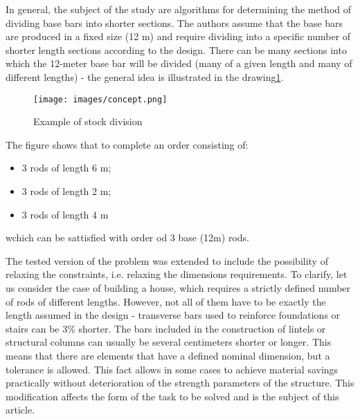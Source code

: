 In general, the subject of the study are algorithms for determining the method of dividing base bars into shorter sections. The authors assume that the base bars are produced in a fixed size (12 m) and require dividing into a specific number of shorter length sections according to the design. There can be many sections into which the 12-meter base bar will be divided (many of a given length and many of different lengths) - the general idea is illustrated in the drawing\ref{fig:concept}.

\begin{figure}[h]
    \centering
    \texttt{[image: images/concept.png]}
    \caption{Example of stock division}
    \label{fig:concept}
\end{figure}

The figure shows that to complete an order consisting of:
\begin{itemize}
\item 3 rods of length 6 m;
\item 3 rods of length 2 m;
\item 3 rods of length 4 m
\end{itemize}
wchich can be sattisfied with order od 3 base (12m) rods.

The tested version of the problem was extended to include the possibility of relaxing the constraints, i.e. relaxing the dimensions requirements. To clarify, let us consider the case of building a house, which requires a strictly defined number of rods of different lengths. However, not all of them have to be exactly the length assumed in the design - transverse bars used to reinforce foundations or stairs can be 3\% shorter. The bars included in the construction of lintels or structural columns can usually be several centimeters shorter or longer. This means that there are elements that have a defined nominal dimension, but a tolerance is allowed. This fact allows in some cases to achieve material savings practically without deterioration of the strength parameters of the structure. This modification affects the form of the task to be solved and is the subject of this article.





